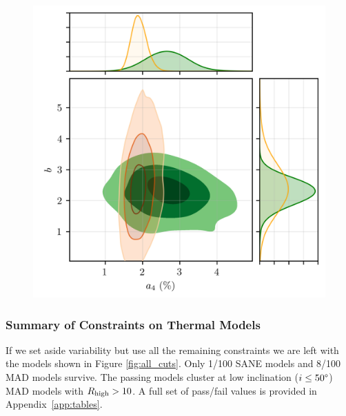 \begin{figure}
  \centering
  \includegraphics[width=\columnwidth]{./figures/grmhd_fit.png}
  \caption{}
  \label{fig:cmp_VLBI_var}
\end{figure}


\subsubsection{Summary of Constraints on Thermal Models}

If we set aside variability but use all the remaining constraints we are left with the models shown in Figure \ref{fig:all_cuts}.  Only 1/100 SANE models and 8/100 MAD models survive. The passing models cluster at low inclination ($i \le 50\degree$) MAD models with $R_\mathrm{high} > 10$.  A full set of pass/fail values is provided in Appendix~\ref{app:tables}.

